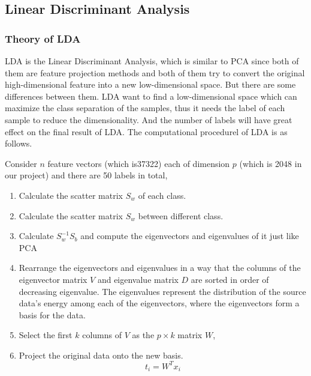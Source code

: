 \documentclass{article}
\begin{document}
\subsection{Linear Discriminant Analysis}
\subsubsection{Theory of LDA}
LDA is the Linear Discriminant Analysis, which is similar to PCA since both of them are feature projection methods and both of them try to convert the original high-dimensional feature into a new low-dimensional space. But there are some differences between them. LDA want to find a low-dimensional space which can maximize the class separation of the samples, thus it needs the label of each sample to reduce the dimensionality. And the number of labels will have great effect on the final result of LDA. The computational procedurel of LDA is as follows.

Consider $n$ feature vectors (which is37322) each of dimension $p$ (which is 2048 in our project) and there are 50 labels in total, 
\begin{enumerate}
	\item Calculate the scatter matrix $S_w$ of each class.
	
	\item Calculate the scatter matrix $S_w$  between different class.
	
	\item Calculate $S^{-1}_wS_b$ and compute the eigenvectors and eigenvalues of it just like PCA
	
	\item Rearrange the eigenvectors and eigenvalues in a way that the columns of the eigenvector matrix $V$ and eigenvalue matrix $D$ are sorted in order of decreasing eigenvalue. The eigenvalues represent the distribution of the source data's energy among each of the eigenvectors, where the eigenvectors form a basis for the data.
	
	\item Select the first $k$ columns of $V$ as the $p \times k$ matrix $W$, 
	
	\item Project the original data onto the new basis. 
	\begin{equation}
	t_i = W^T x_i \label{eq:proj}
	\end{equation}
	
\end{enumerate}
\end{document}
